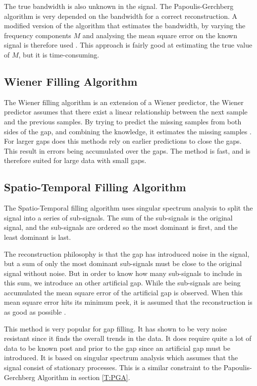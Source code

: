 The true bandwidth is also unknown in the signal. The Papoulis-Gerchberg algorithm is very depended on the bandwidth for a correct reconstruction. A modified version of the algorithm that estimates the bandwidth, by varying the frequency components $M$ and analysing the mean square error on the known signal is therefore used \cite{RefWorks:13}. This approach is fairly good at estimating the true value of $M$, but it is time-consuming.

\subsection{Wiener Filling Algorithm}
The Wiener filling algorithm is an extension of a Wiener predictor, the Wiener predictor assumes that there exist a linear relationship between the next sample and the previous samples. By trying to predict the missing samples from both sides of the gap, and combining the knowledge, it estimates the missing samples \citep{RefWorks:14}. For larger gaps does this methods rely on earlier predictions to close the gaps. This result in errors being accumulated over the gaps. The method is fast, and is therefore suited for large data with small gaps. 

\subsection{Spatio-Temporal Filling Algorithm}
The Spatio-Temporal filling algorithm uses singular spectrum analysis to split the signal into a series of sub-signals. The sum of the sub-signals is the original signal, and the sub-signals are ordered so the most dominant is first, and the least dominant is last. 

The reconstruction philosophy is that the gap has introduced noise in the signal, but a sum of only the most dominant sub-signals must be close to the original signal without noise. But in order to know how many sub-signals to include in this sum, we introduce an other artificial gap. While the sub-signals are being accumulated the mean square error of the artificial gap is observed. When this mean square error hits its minimum peek, it is assumed that the reconstruction is as good as possible \cite{RefWorks:15}.

This method is very popular for gap filling. It has shown to be very noise resistant since it finds the overall trends in the data. It does require quite a lot of data to be known post and prior to the gap since an artificial gap must be introduced. It is based on singular spectrum analysis which assumes that the signal consist of stationary processes. This is a similar constraint to the Papoulis-Gerchberg Algorithm in section \ref{T:PGA}.

